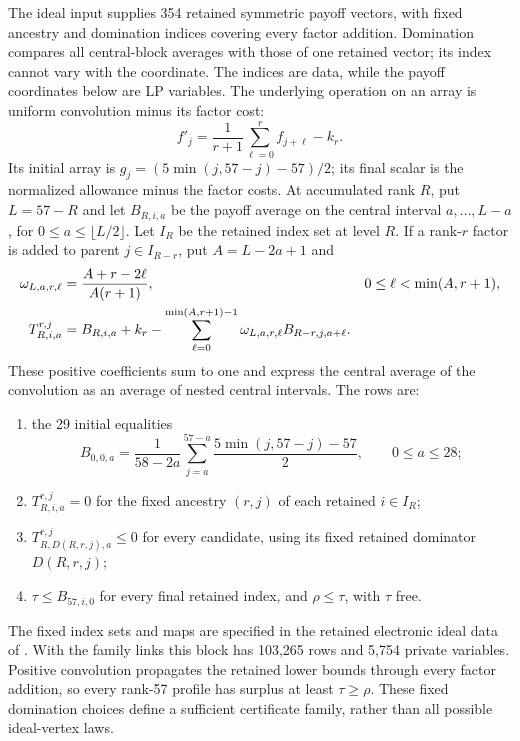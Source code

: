 The ideal input supplies 354 retained symmetric payoff vectors, with
fixed ancestry and domination indices covering every factor addition.
Domination compares all central-block averages with those of one
retained vector; its index cannot vary with the coordinate. The indices
are data, while the payoff coordinates below are LP variables. The
underlying operation on an array is uniform convolution minus its
factor cost:
\[
 f'_j=\frac1{r+1}\sum_{\ell=0}^r f_{j+\ell}-k_r.
\]
Its initial array is $g_j=(5\min(j,57-j)-57)/2$; its final scalar
is the normalized allowance minus the factor costs. At accumulated
rank $R$, put $L=57-R$ and let
$B_{R,i,a}$ be the payoff average on the
central interval $a,\ldots,L-a$, for
$0\le a\le\lfloor L/2\rfloor$. Let $I_R$ be the retained index
set at level $R$. If a rank-$r$ factor is added to parent
$j\in I_{R-r}$, put $A=L-2a+1$ and
\begin{align}
 \omega_{L,a,r,\ell}&=\frac{A+r-2\ell}{A(r+1)},
       &&0\le\ell<\min(A,r+1),\notag\\
 T_{R,i,a}^{r,j}&=B_{R,i,a}+k_r-
       \sum_{\ell=0}^{\min(A,r+1)-1}
           \omega_{L,a,r,\ell}B_{R-r,j,a+\ell}.
       \label{fv:ideal-average-transform}
\end{align}
These positive coefficients sum to one and express the central average
of the convolution as an average of nested central intervals. The rows
are:
\begin{enumerate}[label=\textup{(\roman*)},nosep]
\item the 29 initial equalities
\[
 B_{0,0,a}=\frac1{58-2a}\sum_{j=a}^{57-a}
                  \frac{5\min(j,57-j)-57}{2},
 \qquad0\le a\le28;
\]
\item $T_{R,i,a}^{r,j}=0$ for the fixed ancestry $(r,j)$ of
 each retained $i\in I_R$;
\item $T_{R,D(R,r,j),a}^{r,j}\le0$ for every candidate, using
 its fixed retained dominator $D(R,r,j)$;
\item $\tau\le B_{57,i,0}$ for every final retained index, and
 $\rho\le\tau$, with $\tau$ free.
\end{enumerate}
The fixed index sets and maps are specified in the retained electronic
ideal data of \cite{LPRepository}. With the family links this block has
103,265 rows and 5,754 private variables. Positive convolution propagates
the retained lower bounds through every factor addition, so every
rank-57 profile has surplus at least $\tau\ge\rho$. These fixed
domination choices define a sufficient certificate family, rather than
all possible ideal-vertex laws.

